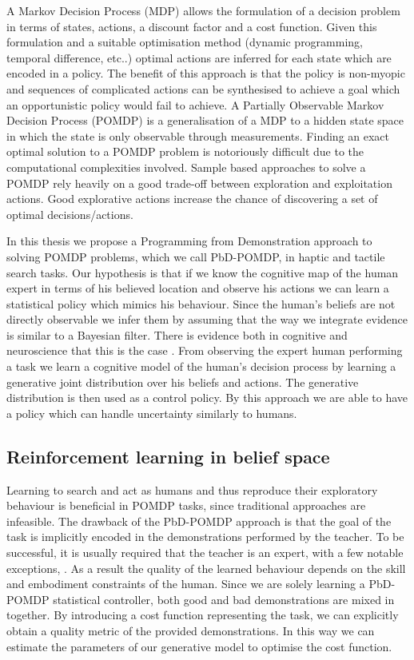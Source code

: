 A Markov Decision Process (MDP) allows the formulation of a decision problem in terms of states, actions, a discount factor 
and a cost function. Given this formulation and a suitable optimisation method (dynamic programming, temporal difference, etc..) 
optimal actions are inferred for each state which are encoded in a policy. The benefit of this approach 
is that the policy is non-myopic and sequences of complicated actions can be synthesised to achieve a goal which 
an opportunistic policy would fail to achieve. A Partially Observable Markov Decision Process (POMDP) is 
a generalisation of a MDP to a hidden state space in which the state is only observable 
through measurements. Finding an exact optimal solution to a POMDP problem is notoriously difficult due to 
the computational complexities involved. Sample based approaches to solve a POMDP rely heavily on 
a good trade-off between exploration and exploitation actions. Good explorative actions increase the chance of discovering 
a set of optimal decisions/actions.

In this thesis we propose a Programming from Demonstration approach to solving POMDP problems, which we call PbD-POMDP, in
haptic and tactile search tasks. Our hypothesis is that if we know the cognitive map of the human 
expert in terms of his believed location and observe his actions we can learn a statistical policy 
which mimics his behaviour. Since the human's beliefs are not directly observable we infer them 
by assuming that the way we integrate evidence is similar to a Bayesian filter. There is   
evidence both in cognitive and neuroscience that this is the case \citep{Bake_Saxe_Tene_2011}. From 
observing the expert human performing a task we learn a cognitive model of the human's decision process 
by learning a generative joint distribution over his beliefs and actions. The generative distribution 
is then used as a control policy. By this approach we are able to have a policy which can handle uncertainty
similarly to humans. 

\subsection{Reinforcement learning in belief space}\label{sub:contr2}

Learning to search and act as humans and thus reproduce their exploratory behaviour is beneficial in POMDP tasks, since
traditional approaches are infeasible. The drawback of the PbD-POMDP approach is that the goal of the task is 
implicitly encoded in the demonstrations performed by the teacher. To be successful, it is usually required 
that the teacher is an expert, with a few notable exceptions, \citep{rai2013learning}. As a result the quality of 
the learned behaviour depends on the skill and embodiment constraints of the human. Since we are solely learning 
a PbD-POMDP statistical controller, both good and bad demonstrations are mixed in together. By introducing a cost function 
representing the task, we can explicitly obtain a quality metric of the provided demonstrations. In this way we can estimate the 
parameters of our generative model to optimise the cost function.

